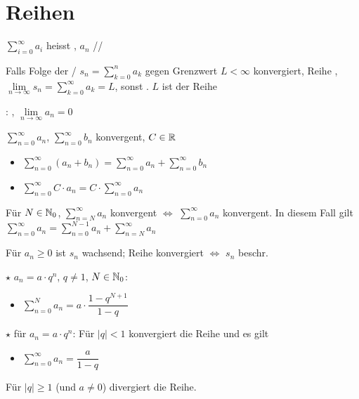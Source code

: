 \section{Reihen}

\Def $\sum_{i=0}^{\infty} a_i$ heisst ,
$a_n$ //

\Def Falls Folge der /
$s_n = \sum_{k=0}^{n} a_k$ gegen Grenzwert $L < \infty$ konvergiert,
Reihe , $\lim\limits_{n\to\infty} s_n = \sum_{k=0}^{\infty} a_k = L$,
sonst . $L$ ist  der Reihe

\Satz {}: , $\lim\limits_{n\to\infty} a_n = 0$

\Satz $\sum_{n=0}^{\infty} a_n$, $\sum_{n=0}^{\infty} b_n$ konvergent, $C \in \mathbb{R}$
\vspace{-0.6em}
\begin{itemize}
    \item $\sum_{n=0}^{\infty} (a_n + b_n) = \sum_{n=0}^{\infty} a_n + \sum_{n=0}^{\infty} b_n$
    \item $\sum_{n=0}^{\infty} C \cdot a_n = C \cdot \sum_{n=0}^{\infty} a_n$
\end{itemize}

\Satz Für $N \in \mathbb{N}_0$, $\sum_{n=N}^{\infty} a_n$ konvergent $\iff$ $\sum_{n=0}^{\infty} a_n$ konvergent.
In diesem Fall gilt $\sum_{n=0}^{\infty} a_n = \sum_{n=0}^{N-1} a_n + \sum_{n=N}^{\infty} a_n$

\Satz Für $a_n\ge 0$ ist $s_n$ wachsend; Reihe konvergiert $\iff$ $s_n$ beschr.

\Satz $\star$  $a_n = a \cdot q^n$, $q \ne 1$, $N \in \mathbb{N}_0$:
\vspace{-0.6em}
\begin{itemize}
    \item $\sum_{n=0}^{N} a_n = a \cdot \dfrac{1 - q^{N+1}}{1 - q}$
\end{itemize}

\Satz $\star$  für $a_n = a \cdot q^n$: Für $|q| < 1$ konvergiert die Reihe und es gilt
\vspace{-0.6em}
\begin{itemize}
    \item $\sum_{n=0}^{\infty} a_n = \dfrac{a}{1 - q}$
\end{itemize}
Für $|q| \ge 1$ (und $a \ne 0$) divergiert die Reihe.

